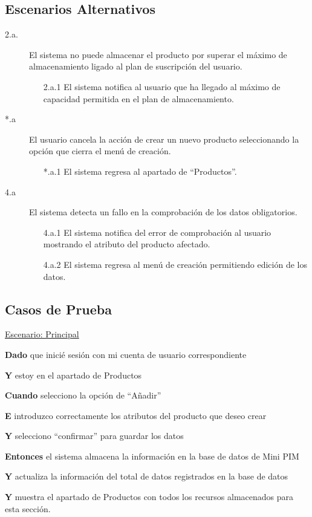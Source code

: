 \documentclass[a4paper,12pt]{article}
\begin{document}
\subsection{Escenarios Alternativos}
\begin{description}
    \item[2.a.] El sistema no puede almacenar el producto por superar el máximo de almacenamiento ligado al plan de suscripción del usuario.
    \begin{enumerate}
        \item[2.a.1] El sistema notifica al usuario que ha llegado al máximo de capacidad permitida en el plan de almacenamiento.
    \end{enumerate}

    \item[*.a] El usuario cancela la acción de crear un nuevo producto seleccionando la opción que cierra el menú de creación.
    \begin{enumerate}
        \item[*.a.1] El sistema regresa al apartado de \enquote{Productos}.
    \end{enumerate}

    \item[4.a] El sistema detecta un fallo en la comprobación de los datos obligatorios.
    \begin{enumerate}
        \item[4.a.1] El sistema notifica del error de comprobación al usuario mostrando el atributo del producto afectado.
        \item[4.a.2] El sistema regresa al menú de creación permitiendo edición de los datos.
    \end{enumerate}
\end{description}

\subsection{Casos de Prueba}
\underline{Escenario: Principal}\par
\vspace{0.15cm}
\textbf{Dado} que inicié sesión con mi cuenta de usuario correspondiente\par
\textbf{Y} estoy en el apartado de Productos\par
\textbf{Cuando} selecciono la opción de \enquote{Añadir}\par
\textbf{E} introduzco correctamente los atributos del producto que deseo crear\par
\textbf{Y} selecciono \enquote{confirmar} para guardar los datos\par
\textbf{Entonces} el sistema almacena la información en la base de datos de Mini PIM\par
\textbf{Y} actualiza la información del total de datos registrados en la base de datos\par
\textbf{Y} muestra el apartado de Productos con todos los recursos almacenados para esta sección.\par
\vspace{0.20cm}
\end{document}
